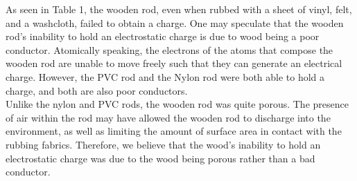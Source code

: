 \documentclass[12pt]{amsart}
\begin{document}
\indent As seen in Table 1, the wooden rod, even when rubbed with a sheet of vinyl, felt, and a washcloth, failed to obtain a charge. One may speculate that the wooden rod's inability to hold an electrostatic charge is due to wood being a poor conductor. Atomically speaking, the electrons of the atoms that compose the wooden rod are unable to move freely such that they can generate an electrical charge. However, the PVC rod and the Nylon rod were both able to hold a charge, and both are also poor conductors.\\
\indent Unlike the nylon and PVC rods, the wooden rod was quite porous. The presence of air within the rod may have allowed the wooden rod to discharge into the environment, as well as limiting the amount of surface area in contact with the rubbing fabrics. Therefore, we believe that the wood's inability to hold an electrostatic charge was due to the wood being porous rather than a bad conductor.
\newpage

\printbibliography

	
\end{document}
